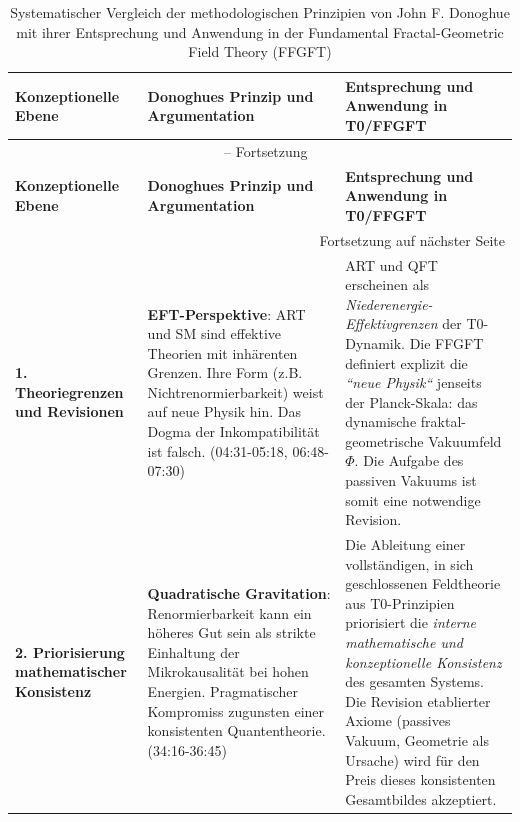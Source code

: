 	\begin{longtable}{p{} p{} p{}}
		\caption{Systematischer Vergleich der methodologischen Prinzipien von John F. Donoghue mit ihrer Entsprechung und Anwendung in der Fundamental Fractal-Geometric Field Theory (FFGFT)} \\
		\toprule
		\textbf{Konzeptionelle Ebene} & \textbf{Donoghues Prinzip und Argumentation} & \textbf{Entsprechung und Anwendung in T0/FFGFT} \\
		\midrule
		\endfirsthead
		
		\multicolumn{3}{c}{{\tablename\ \thetable{} -- Fortsetzung}} \\
		\toprule
		\textbf{Konzeptionelle Ebene} & \textbf{Donoghues Prinzip und Argumentation} & \textbf{Entsprechung und Anwendung in T0/FFGFT} \\
		\midrule
		\endhead
		
		\midrule \multicolumn{3}{r}{{Fortsetzung auf nächster Seite}} \\
		\endfoot
		
		\bottomrule
		\endlastfoot
		\textbf{1. Theoriegrenzen und Revisionen} & 
		\textbf{EFT-Perspektive}: ART und SM sind effektive Theorien mit inhärenten Grenzen. Ihre Form (z.B. Nichtrenormierbarkeit) weist auf neue Physik hin. Das Dogma der Inkompatibilität ist falsch. \cite{DonoghueInterview2025} (04:31-05:18, 06:48-07:30) & 
		ART und QFT erscheinen als \emph{Niederenergie-Effektivgrenzen} der T0-Dynamik. Die FFGFT definiert explizit die \emph{``neue Physik``} jenseits der Planck-Skala: das dynamische fraktal-geometrische Vakuumfeld $\Phi$. Die Aufgabe des passiven Vakuums ist somit eine notwendige Revision. \\
		\midrule
		
		\textbf{2. Priorisierung mathematischer Konsistenz} & 
		\textbf{Quadratische Gravitation}: Renormierbarkeit kann ein höheres Gut sein als strikte Einhaltung der Mikrokausalität bei hohen Energien. Pragmatischer Kompromiss zugunsten einer konsistenten Quantentheorie. \cite{DonoghueInterview2025} (34:16-36:45) & 
		Die Ableitung einer vollständigen, in sich geschlossenen Feldtheorie aus T0-Prinzipien priorisiert die \emph{interne mathematische und konzeptionelle Konsistenz} des gesamten Systems. Die Revision etablierter Axiome (passives Vakuum, Geometrie als Ursache) wird für den Preis dieses konsistenten Gesamtbildes akzeptiert. \\
		\midrule
		

\end{longtable}
